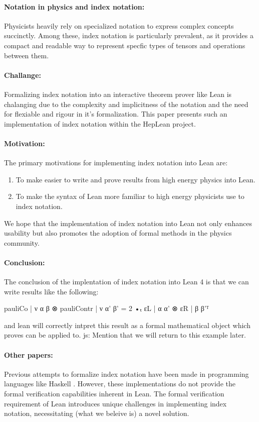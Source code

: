 \documentclass[a4paper, 11pt]{article}
\newcommand{\js}[1]{ {\color{magenta} js:  #1}}
\begin{document}
\paragraph{Notation in physics and index notation:}
Physicists heavily rely on specialized notation to express complex concepts succinctly. 
Among these, index notation is particularly prevalent,
 as it provides a compact and readable way to represent specfic types of tensors and operations
 between them.

\paragraph{Challange:} Formalizing index notation into an interactive theorem prover like Lean 
is chalanging due to the complexity and implicitness 
of the notation and the need for flexiable  and rigour in it's formalization. 
This paper presents such an implementation of index notation within the HepLean project.


\paragraph{Motivation:} The primary motivations for implementing index notation into Lean are:
\begin{enumerate}
  \item To make easier to write and prove results from high energy physics into Lean. 
  \item To make the syntax of Lean more familiar to high energy physicists use to index notation.
\end{enumerate}
We hope that the implementation  of index notation into Lean
not only enhances usability but also promotes the adoption of formal methods in the 
physics community.

\paragraph{Conclusion:} The conclusion of the implentation of index notation into Lean 4 is that 
we can write results like the following: 
\begin{code}
{pauliCo | ν α β ⊗ pauliContr | ν α' β' = 2 •ₜ εL | α α' ⊗ εR | β β'}ᵀ
\end{code}
and lean will correctly intpret this result as a formal mathematical object which proves can be 
applied to.\js{Mention that we will return to this example later.}


\paragraph{Other papers:}
Previous attempts to formalize index notation have been made in programming languages like Haskell 
\cite{ref}. However, these implementations do not
 provide the formal verification capabilities inherent in Lean. 
 The formal verification requirement of Lean introduces unique challenges in implementing index 
 notation, necessitating (what we beleive is) a novel solution.
\end{document}
